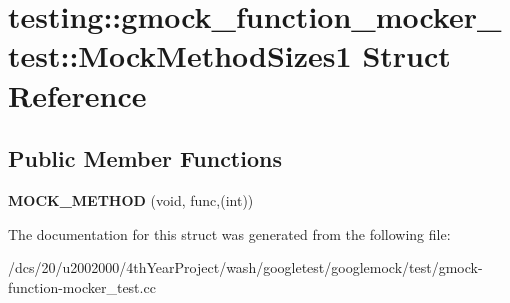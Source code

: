\hypertarget{structtesting_1_1gmock__function__mocker__test_1_1MockMethodSizes1}{}\section{testing\+:\+:gmock\+\_\+function\+\_\+mocker\+\_\+test\+:\+:Mock\+Method\+Sizes1 Struct Reference}
\label{structtesting_1_1gmock__function__mocker__test_1_1MockMethodSizes1}
\subsection*{Public Member Functions}
\begin{DoxyCompactItemize}
\item 
\mbox{\label{structtesting_1_1gmock__function__mocker__test_1_1MockMethodSizes1_af4255cca5805a41a3604efcda13a1a86}} 
{\bfseries M\+O\+C\+K\+\_\+\+M\+E\+T\+H\+OD} (void, func,(int))
\end{DoxyCompactItemize}


The documentation for this struct was generated from the following file\+:\begin{DoxyCompactItemize}
\item 
/dcs/20/u2002000/4th\+Year\+Project/wash/googletest/googlemock/test/gmock-\/function-\/mocker\+\_\+test.\+cc\end{DoxyCompactItemize}
